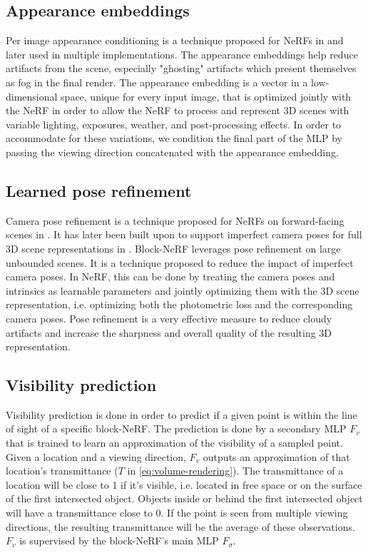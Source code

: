 \subsection{Appearance embeddings} \label{sec:appearance-embeddings}
Per image appearance conditioning is a technique proposed for NeRFs in \cite{martin-brualla_nerf_2021} and later used in multiple implementations. The appearance embeddings help reduce artifacts from the scene, especially "ghosting" artifacts which present themselves as fog in the final render. The appearance embedding is a vector in a low-dimensional space, unique for every input image, that is optimized jointly with the NeRF in order to allow the NeRF to process and represent 3D scenes with variable lighting, exposures, weather, and post-processing effects. In order to accommodate for these variations, we condition the final part of the MLP by passing the viewing direction concatenated with the appearance embedding. 

\subsection{Learned pose refinement} \label{sec:camera-pose-refinement}
Camera pose refinement is a technique proposed for NeRFs on forward-facing scenes in \cite{wang_nerf--_2022}. It has later been built upon to support imperfect camera poses for full 3D scene representations in \cite{lin_barf_2021}. Block-NeRF leverages pose refinement on large unbounded scenes. It is a technique proposed to reduce the impact of imperfect camera poses. In NeRF, this can be done by treating the camera poses and intrinsics as learnable parameters and jointly optimizing them with the 3D scene representation, i.e. optimizing both the photometric loss and the corresponding camera poses. Pose refinement is a very effective measure to reduce cloudy artifacts and increase the sharpness and overall quality of the resulting 3D representation.

\subsection{Visibility prediction}
Visibility prediction is done in order to predict if a given point is within the line of sight of a specific block-NeRF. The prediction is done by a secondary MLP $F_v$ that is trained to learn an approximation of the visibility of a sampled point. Given a location and a viewing direction, $F_v$ outputs an approximation of that location's transmittance ($T$ in \autoref{eq:volume-rendering}). The transmittance of a location will be close to 1 if it's visible, i.e. located in free space or on the surface of the first intersected object. Objects inside or behind the first intersected object will have a transmittance close to 0. If the point is seen from multiple viewing directions, the resulting transmittance will be the average of these observations. $F_v$ is supervised by the block-NeRF's main MLP $F_\sigma$.



